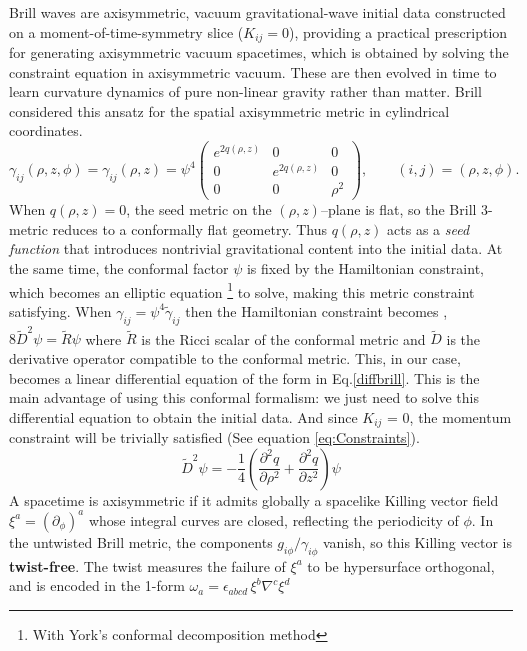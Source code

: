 Brill waves are axisymmetric, vacuum gravitational-wave initial data constructed on a moment-of-time-symmetry slice ($K_{ij} = 0$), providing a practical prescription for generating axisymmetric vacuum spacetimes,  which is obtained by solving the constraint equation in axisymmetric vacuum. These are then evolved in time to learn curvature dynamics of pure non-linear gravity rather than matter. Brill considered this ansatz for the spatial axisymmetric metric in cylindrical coordinates.
$$
\gamma_{ij}(\rho,z,\phi) = \gamma_{ij}(\rho,z) = 
\psi ^4\begin{pmatrix}
    e^{2q(\rho,z)} & 0 & 0 \\
    0 & e^{2q(\rho,z)} & 0 \\
    0 & 0 & \rho^{2}
\end{pmatrix},
\qquad (i,j) = (\rho, z, \phi).
$$
When $q(\rho,z)=0$, the seed metric on the $(\rho,z)$--plane is flat, so the Brill
3-metric
reduces to a conformally flat geometry. Thus $q(\rho,z)$ acts as a \emph{seed function}
that introduces nontrivial gravitational content into the initial data. At the same time, the
conformal factor $\psi$ is fixed by the Hamiltonian constraint, which becomes an elliptic equation \footnote{With York's conformal decomposition method} to solve, making this metric constraint satisfying. When $\gamma_{ij} = \psi ^4 \tilde{\gamma}_{ij}$ then the Hamiltonian constraint becomes ,
$
8 \tilde{D}^2 \psi =\tilde{R} \psi 
$
where $\tilde{R}$ is the Ricci scalar of the conformal metric and $\tilde{D} $ is the derivative operator compatible to the conformal metric. This, in our case, becomes a linear differential equation of the form in Eq.\ref{diffbrill}. This is the main advantage of using this conformal formalism: we just need to solve this differential equation to obtain the initial data. And since $K_{ij}$ = 0, the momentum constraint will be trivially satisfied (See equation \ref{eq:Constraints}).
\begin{equation}
\tilde{D}^2 \psi = -\dfrac{1}{4} \left( \dfrac{\partial^2 q}{\partial \rho^2}+ \dfrac{\partial^2 q}{\partial{z^2}} \right)\psi
\label{diffbrill}
\end{equation}
A spacetime is axisymmetric if it admits globally a
spacelike Killing vector field $\xi^a=(\partial_\phi)^a $ whose integral curves are
closed, reflecting the periodicity of $\phi$. In the untwisted Brill metric, the
components $g_{i\phi}/ \gamma_{i \phi}$ vanish, so this Killing vector is \textbf{twist-free}. The twist
measures the failure of $\xi^a$ to be hypersurface orthogonal, and is encoded in the
1-form $ \omega_a = \epsilon_{abcd}\,\xi^b \nabla^c \xi^d $
